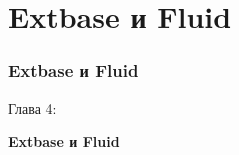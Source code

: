 %

\section{Extbase и Fluid}
\begin{frame}[fragile]
	\frametitle{Extbase и Fluid}

	\begin{center}\huge{Глава 4:}\end{center}
	\begin{center}\huge{\color{typo3darkgrey}\textbf{Extbase и Fluid}}\end{center}

\end{frame}


